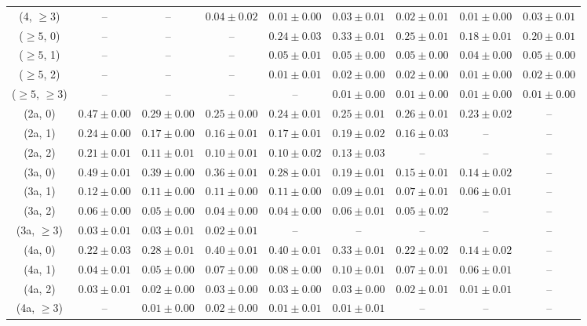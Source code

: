 \begin{table}[h!]
{\begin{tabular}{ccccccccc}
	(4, $\ge3$) & -- & -- & $0.04\pm 0.02$ & $0.01\pm 0.00$ & $0.03\pm 0.01$ & $0.02\pm 0.01$ & $0.01\pm 0.00$ & $0.03\pm 0.01$ \\[0.5ex] 
	($\ge5$, 0) & -- & -- & -- & $0.24\pm 0.03$ & $0.33\pm 0.01$ & $0.25\pm 0.01$ & $0.18\pm 0.01$ & $0.20\pm 0.01$ \\[0.5ex] 
	($\ge5$, 1) & -- & -- & -- & $0.05\pm 0.01$ & $0.05\pm 0.00$ & $0.05\pm 0.00$ & $0.04\pm 0.00$ & $0.05\pm 0.00$ \\[0.5ex] 
	($\ge5$, 2) & -- & -- & -- & $0.01\pm 0.01$ & $0.02\pm 0.00$ & $0.02\pm 0.00$ & $0.01\pm 0.00$ & $0.02\pm 0.00$ \\[0.5ex] 
	($\ge5$, $\ge3$) & -- & -- & -- & -- & $0.01\pm 0.00$ & $0.01\pm 0.00$ & $0.01\pm 0.00$ & $0.01\pm 0.00$ \\[0.5ex] 
	(2a, 0) & $0.47\pm 0.00$ & $0.29\pm 0.00$ & $0.25\pm 0.00$ & $0.24\pm 0.01$ & $0.25\pm 0.01$ & $0.26\pm 0.01$ & $0.23\pm 0.02$ & -- \\[0.5ex] 
	(2a, 1) & $0.24\pm 0.00$ & $0.17\pm 0.00$ & $0.16\pm 0.01$ & $0.17\pm 0.01$ & $0.19\pm 0.02$ & $0.16\pm 0.03$ & -- & -- \\[0.5ex] 
	(2a, 2) & $0.21\pm 0.01$ & $0.11\pm 0.01$ & $0.10\pm 0.01$ & $0.10\pm 0.02$ & $0.13\pm 0.03$ & -- & -- & -- \\[0.5ex] 
	(3a, 0) & $0.49\pm 0.01$ & $0.39\pm 0.00$ & $0.36\pm 0.01$ & $0.28\pm 0.01$ & $0.19\pm 0.01$ & $0.15\pm 0.01$ & $0.14\pm 0.02$ & -- \\[0.5ex] 
	(3a, 1) & $0.12\pm 0.00$ & $0.11\pm 0.00$ & $0.11\pm 0.00$ & $0.11\pm 0.00$ & $0.09\pm 0.01$ & $0.07\pm 0.01$ & $0.06\pm 0.01$ & -- \\[0.5ex] 
	(3a, 2) & $0.06\pm 0.00$ & $0.05\pm 0.00$ & $0.04\pm 0.00$ & $0.04\pm 0.00$ & $0.06\pm 0.01$ & $0.05\pm 0.02$ & -- & -- \\[0.5ex] 
	(3a, $\ge3$) & $0.03\pm 0.01$ & $0.03\pm 0.01$ & $0.02\pm 0.01$ & -- & -- & -- & -- & -- \\[0.5ex] 
	(4a, 0) & $0.22\pm 0.03$ & $0.28\pm 0.01$ & $0.40\pm 0.01$ & $0.40\pm 0.01$ & $0.33\pm 0.01$ & $0.22\pm 0.02$ & $0.14\pm 0.02$ & -- \\[0.5ex] 
	(4a, 1) & $0.04\pm 0.01$ & $0.05\pm 0.00$ & $0.07\pm 0.00$ & $0.08\pm 0.00$ & $0.10\pm 0.01$ & $0.07\pm 0.01$ & $0.06\pm 0.01$ & -- \\[0.5ex] 
	(4a, 2) & $0.03\pm 0.01$ & $0.02\pm 0.00$ & $0.03\pm 0.00$ & $0.03\pm 0.00$ & $0.03\pm 0.00$ & $0.02\pm 0.01$ & $0.01\pm 0.01$ & -- \\[0.5ex] 
	(4a, $\ge3$) & -- & $0.01\pm 0.00$ & $0.02\pm 0.00$ & $0.01\pm 0.01$ & $0.01\pm 0.01$ & -- & -- & -- \\[0.5ex] 

\end{tabular}}
\end{table}
